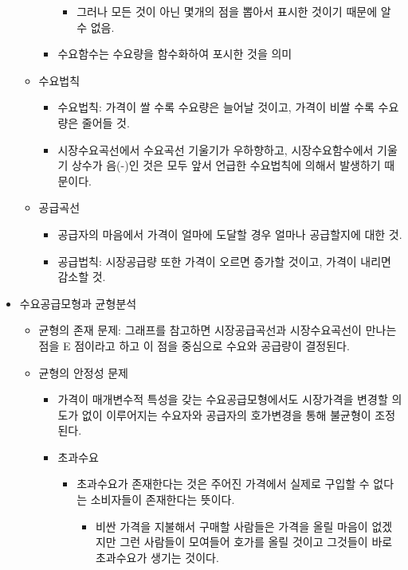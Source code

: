 \documentclass{report}
\begin{document}
\begin{itemize}
\begin{itemize}
\begin{itemize}
            \begin{itemize}
                \item 그러나 모든 것이 아닌 몇개의 점을 뽑아서 표시한 것이기 때문에 알 수 없음.
            \end{itemize}
            \item 수요함수는 수요량을 함수화하여 포시한 것을 의미
        \end{itemize}
        \item 수요법칙
        \begin{itemize}
            \item 수요법칙: 가격이 쌀 수록 수요량은 늘어날 것이고, 가격이 비쌀 수록 수요량은 줄어들 것.
            \item 시장수요곡선에서 수요곡선 기울기가 우하향하고, 시장수요함수에서 기울기 상수가 음(-)인 것은 모두 앞서 언급한 수요법칙에 의해서 발생하기 때문이다.
        \end{itemize}
        \item 공급곡선
        \begin{itemize}
            \item 공급자의 마음에서 가격이 얼마에 도달할 경우 얼마나 공급할지에 대한 것.
            \item 공급법칙: 시장공급량 또한 가격이 오르면 증가할 것이고, 가격이 내리면 감소할 것.
        \end{itemize}
    \end{itemize}
    \item 수요공급모형과 균형분석
    \begin{itemize}
        \item 균형의 존재 문제: 그래프를 참고하면 시장공급곡선과 시장수요곡선이 만나는 점을 E 점이라고 하고 이 점을 중심으로 수요와 공급량이 결정된다.
        \item 균형의 안정성 문제
        \begin{itemize}
            \item 가격이 매개변수적 특성을 갖는 수요공급모형에서도 시장가격을 변경할 의도가 없이 이루어지는 수요자와 공급자의 호가변경을 통해 불균형이 조정된다.
            \item 초과수요
            \begin{itemize}
                \item 초과수요가 존재한다는 것은 주어진 가격에서 실제로 구입할 수 없다는 소비자들이 존재한다는 뜻이다.
                \begin{itemize}
                    \item 비싼 가격을 지불해서 구매할 사람들은 가격을 올릴 마음이 없겠지만 그런 사람들이 모여들어 호가를 올릴 것이고 그것들이 바로 초과수요가 생기는 것이다.

\end{itemize}
\end{itemize}
\end{itemize}
\end{itemize}
\end{itemize}
\end{document}

